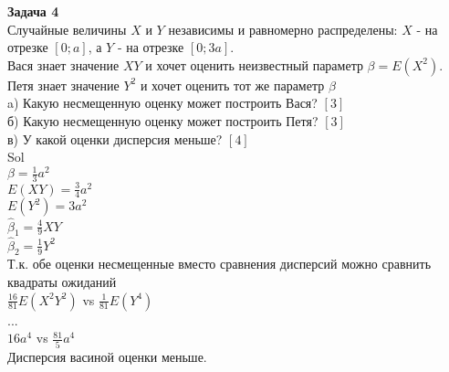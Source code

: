 \documentclass[pdftex,12pt,a4paper]{article}
\begin{document}
\textbf{Задача 4} \\ 
Случайные величины $X$ и $Y$ независимы и равномерно распределены: $X$ - на отрезке $[0;a]$, а $Y$ - на отрезке $[0;3a]$. \\
Вася знает значение $XY$ и хочет оценить неизвестный параметр $\beta=E(X^{2})$. \\
Петя знает значение $Y^2$ и хочет оценить тот же параметр $\beta$ \\
a) Какую несмещенную оценку может построить Вася? $[3]$ \\
б) Какую несмещенную оценку может построить Петя? $[3]$ \\
в) У какой оценки дисперсия меньше? $[4]$ \\
Sol \\
$\beta=\frac{1}{3}a^{2}$ \\
$E(XY)=\frac{3}{4}a^{2}$ \\
$E(Y^{2})=3a^{2}$\\
$\hat{\beta}_{1}=\frac{4}{9}XY$ \\
$\hat{\beta}_{2}=\frac{1}{9}Y^{2}$ \\
Т.к. обе оценки несмещенные вместо сравнения дисперсий можно сравнить квадраты ожиданий \\
$\frac{16}{81}E(X^{2}Y^{2})$ vs $\frac{1}{81}E(Y^{4})$ \\
... \\
$16 a^4$ vs $\frac{81}{5} a^{4}$ \\
Дисперсия васиной оценки меньше. \\



 

\end{document}
